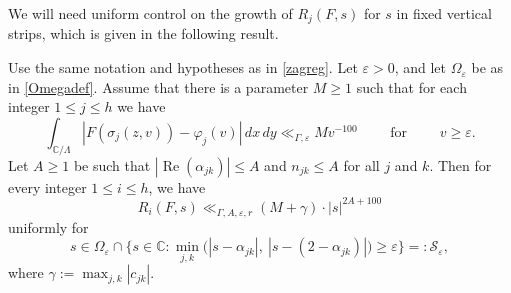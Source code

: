 \documentclass[12pt,reqno]{amsart}
\numberwithin{equation}{section}
\renewcommand{\Re}{\operatorname{Re}}
\newcommand{\C}{\mathbb{C}}
\begin{document}

We will need uniform control on the growth of $R_j(F, s)$ for $s$ in fixed vertical strips, which is given in the following result. 

\begin{prop}\label{prop:RS_growth_estimate}
    Use the same notation and hypotheses as in \cref{zagreg}. Let $\varepsilon > 0$, and let $\Omega_{\varepsilon}$ be as in \eqref{Omegadef}. Assume that there is a parameter $M \geq 1$ such that for each integer $1\leq j \leq h$ we have
    \begin{equation}\label{eq:improved_F_asympt}
        \int_{\C/\Lambda} |{F(\sigma_j (z, v)) - \varphi_j(v)}| \, dx \, dy \ll_{\Gamma, \varepsilon} M v^{-100} \qquad \text{ for } \qquad v \geq \varepsilon.
    \end{equation}
Let $A \geq 1$ be such that $|{\Re(\alpha_{jk})}| \leq A$ and $n_{jk}\leq A$ for all $j$ and $k$. Then for every integer $1\leq i \leq h$, we have
\begin{equation}\label{eq:RS_growth_estimate}
R_i(F, s) \ll_{\Gamma, A, \varepsilon,r} (M+\gamma) \cdot |{s}|^{2A + 100}
\end{equation}
uniformly for 
\begin{equation}
s \in \Omega_{\varepsilon} \cap \{s \in \mathbb{C}: \min_{j,k} \big( |s-\alpha_{jk}|,\ |s-(2-\alpha_{jk})| \big )\geq\varepsilon \}=:\mathcal{S}_{\varepsilon} ,
\end{equation}
where $\displaystyle\gamma :=  \max_{j, k} |c_{jk}|$.
\end{prop}
\end{document}
